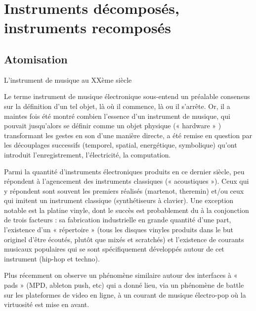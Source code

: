 %
\chapter{Instruments décomposés, instruments recomposés}
\label{ch:introduction}



\section{Atomisation}
\label{sec:introduction:atomisation}
L'instrument de musique au XXème siècle 

Le terme instrument de musique électronique sous-entend un préalable consensus sur la définition d’un tel objet, là où il commence, là ou il s’arrête. Or, il a maintes fois été montré combien l’essence d’un instrument de musique, qui pouvait jusqu’alors se définir comme un objet physique (« hardware » ) transformant les gestes en son d’une manière directe, a été remise en question par les découplages successifs (temporel, spatial, energétique, symbolique) qu’ont introduit l’enregistrement, l’électricité, la computation.

Parmi la quantité d’instruments électroniques produits en ce dernier siècle, peu répondent à l’agencement des instruments classiques (« acoustiques »). Ceux qui y répondent sont souvent les premiers réalisés (martenot, theremin) et/ou ceux qui imitent un instrument classique (synthétiseurs à clavier). Une exception notable est la platine vinyle, dont le succès est probablement du à la conjonction de trois facteurs : sa fabrication industrielle en grande quantité d’une part, l’existence d’un « répertoire » (tous les disques vinyles produits dans le but originel d’être écoutés, plutôt que mixés et scratchés) et l’existence de courants musicaux populaires qui se sont spécifiquement développés autour de cet instrument (hip-hop et techno). 

Plus récemment on observe un phénomène similaire autour des interfaces à « pads » (MPD, ableton push, etc) qui a donné lieu, via un phénomène de battle sur les plateformes de video en ligne, à un courant de musique électro-pop où la virtuosité est mise en avant.

